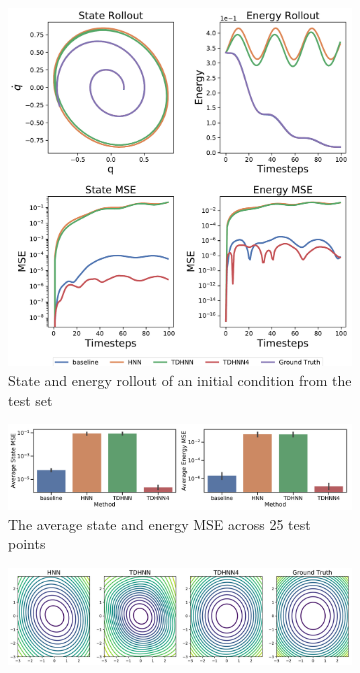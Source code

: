 \documentclass[twoside]{article}
\begin{document}
\begin{figure}[!htb]
\centering
\captionsetup{justification=centering}
\begin{subfigure}[b]{0.48\textwidth}
\includegraphics[width=\textwidth]{figures/figures/damped/1/damped_long_0.pdf}
\caption{State and energy rollout of an initial condition from the test set}
\end{subfigure}
\begin{subfigure}[b]{0.48\textwidth}
\includegraphics[width=\textwidth]{figures/figures/damped/1/damped_errors_0.pdf}
\caption{The average state and energy MSE across 25 test points}
\end{subfigure}
\begin{subfigure}[b]{0.48\textwidth}
\includegraphics[width=\textwidth]{figures/figures/damped/1/damped_hamiltonian_0.pdf}

\end{subfigure}
\end{figure}
\end{document}
